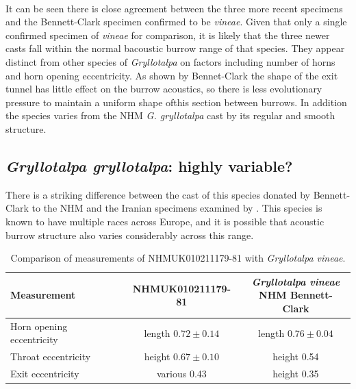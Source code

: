 \documentclass{article}
\begin{document}
   \paragraph{}
   It can be seen there is close agreement between the three more recent specimens and the Bennett-Clark specimen confirmed to be \textit{vineae}. Given that only a single confirmed specimen of \textit{vineae} for comparison, it is likely that the three newer casts fall within the normal bacoustic burrow range of that species. They appear distinct from other species of \textit{Gryllotalpa} on factors including number of horns and horn opening eccentricity. As shown by Bennet-Clark the shape of the exit tunnel has little effect on the burrow acoustics, so there is less evolutionary pressure to maintain a uniform shape ofthis section between burrows. In addition the species varies from the NHM \textit{G. gryllotalpa} cast by its regular and smooth structure.
   
   \subsection{\textit{Gryllotalpa gryllotalpa}: highly variable?}
   There is a striking difference between the cast of this species donated by Bennett-Clark to the NHM and the Iranian specimens examined by \cite{jafari2015}. This species is known to have multiple races across Europe, and it is possible that acoustic burrow structure also varies considerably across this range.
   
   \begin{table}[h]
   	\begin{tabular}{|l|c|c|}
   		\hline 	Measurement &
		   		NHMUK010211179-81 &
		   		\makecell{\textit{Gryllotalpa vineae}\\NHM Bennett-Clark} \\ 
   		\hline  Horn opening eccentricity &
		   		length $0.72\pm0.14$ &
		   		length $0.76\pm0.04$  \\
   		\hline	Throat eccentricity &
		   		height $0.67\pm0.10$ &
		   		height 0.54 \\
   		\hline  Exit eccentricity &
		   		various 0.43 &
			   	height 0.35 \\
   		
   		\hline 
   	\end{tabular}
   	\caption{Comparison of measurements of NHMUK010211179-81 with \textit{Gryllotalpa vineae}.}
   	\label{tab:id_nhm_casts}
   \end{table}
   
\end{document}
